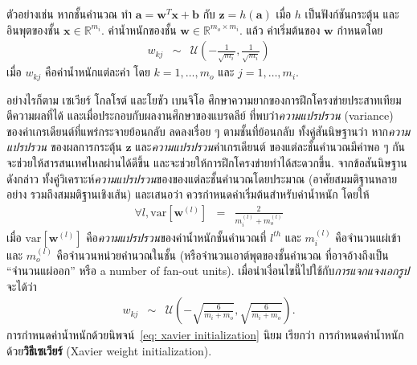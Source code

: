 ตัวอย่างเช่น
หากชั้นคำนวณ ทำ $\bm{a} = \bm{w}^T \bm{x} + \bm{b}$
กับ $\bm{z} = h(\bm{a})$
เมื่อ $h$ เป็นฟังก์ชันกระตุ้น
และอินพุตของชั้น $\bm{x} \in \mathbb{R}^{m_i}$.
ค่าน้ำหนักของชั้น $\bm{w} \in \mathbb{R}^{m_o \times m_i}$.
แล้ว ค่าเริ่มต้นของ $\bm{w}$ 
กำหนดโดย
\begin{eqnarray}
w_{kj}  &\sim& \mathcal{U}\left(-\frac{1}{\sqrt{m_i}},\frac{1}{\sqrt{m_i}} \right)
\label{eq: standard init}
\end{eqnarray}
เมื่อ $w_{kj}$ คือค่าน้ำหนักแต่ละค่า 
โดย $k = 1, \ldots, m_o$
และ 
$j = 1, \ldots, m_i$.


อย่างไรก็ตาม
เซเวียร์ โกลโรต์ และโยชัว เบนจิโอ\cite{GlorotAISTATS2010}
ศึกษาความยากของการฝึกโครงข่ายประสาทเทียม
ตีความผลที่ได้ และเมื่อประกอบกับผลงานศึกษาของแบรดลีย์\cite{Bradley2009} ที่พบว่า\textit{ความแปรปรวน} (variance) ของค่าเกรเดียนต์ที่แพร่กระจายย้อนกลับ
ลดลงเรื่อย ๆ ตามชั้นที่ย้อนกลับ
ทั้งคู่สันนิษฐานว่า
หาก\textit{ความแปรปรวน}
ของผลการกระตุ้น $\bm{z}$
และ\textit{ความแปรปรวน}ค่าเกรเดียนต์
ของแต่ละชั้นคำนวณมีค่าพอ ๆ กัน
จะช่วยให้สารสนเทศไหลผ่านได้ดีขึ้น และจะช่วยให้การฝึกโครงข่ายทำได้สะดวกขึ้น.
จากข้อสันนิษฐานดังกล่าว
ทั้งคู่วิเคราะห์\textit{ความแปรปรวน}ของของแต่ละชั้นคำนวณโดยประมาณ (อาศัยสมมติฐานหลายอย่าง 
รวมถึงสมมติฐานเชิงเส้น)
และเสนอว่า ควรกำหนดค่าเริ่มต้นสำหรับค่าน้ำหนัก
โดยให้
\begin{eqnarray}
\forall l, \mathrm{var}[\bm{w}^{(l)}] &=& \frac{2}{m_i^{(l)} + m_o^{(l)}}
\label{eq: premise xavier init}
\end{eqnarray}
เมื่อ $\mathrm{var}[\bm{w}^{(l)}]$
คือ\textit{ความแปรปรวน}ของค่าน้ำหนักชั้นคำนวณที่ $l^{th}$
และ $m_i^{(l)}$ คือจำนวนแผ่เข้า และ $m_o^{(l)}$ คือจำนวนหน่วยคำนวณในชั้น (หรือจำนวนเอาต์พุตของชั้นคำนวณ ที่อาจอ้างถึงเป็น ``จำนวนแผ่ออก'' หรือ a number of fan-out units).
เมื่อนำเงื่อนไขนี้ไปใช้กับ\textit{การแจกแจงเอกรูป} จะได้ว่า
\begin{eqnarray}
w_{kj} &\sim& \mathcal{U}\left( -\sqrt{\frac{6}{m_i + m_o}}, \sqrt{\frac{6}{m_i + m_o}}\right)
\label{eq: xavier initialization}.
\end{eqnarray}
การกำหนดค่าน้ำหนักด้วยนิพจน์~\ref{eq: xavier initialization}
นิยม เรียกว่า การกำหนดค่าน้ำหนักด้วย\textbf{วิธีเซเวียร์} 
(Xavier weight initialization).

